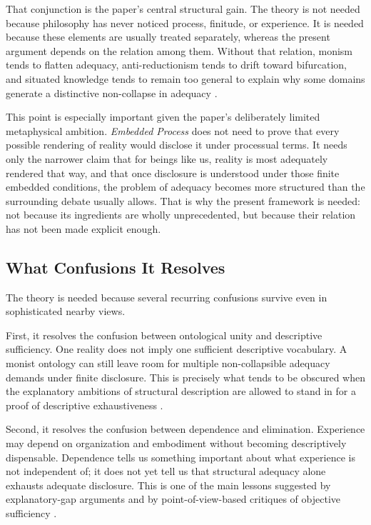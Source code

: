 \documentclass[11pt]{article}
\renewcommand{\emph}[1]{\textit{#1}}
\begin{document}
That conjunction is the paper's central structural gain. The theory is not needed because philosophy has never noticed process, finitude, or experience. It is needed because these elements are usually treated separately, whereas the present argument depends on the relation among them. Without that relation, monism tends to flatten adequacy, anti-reductionism tends to drift toward bifurcation, and situated knowledge tends to remain too general to explain why some domains generate a distinctive non-collapse in adequacy \cite{Whitehead1978,Rescher1996,Haraway1988,Polanyi1958,Nagel1986}.

This point is especially important given the paper's deliberately limited metaphysical ambition. \emph{Embedded Process} does not need to prove that every possible rendering of reality would disclose it under processual terms. It needs only the narrower claim that for beings like us, reality is most adequately rendered that way, and that once disclosure is understood under those finite embedded conditions, the problem of adequacy becomes more structured than the surrounding debate usually allows. That is why the present framework is needed: not because its ingredients are wholly unprecedented, but because their relation has not been made explicit enough.

\subsection{What Confusions It Resolves}

The theory is needed because several recurring confusions survive even in sophisticated nearby views.

First, it resolves the confusion between ontological unity and descriptive sufficiency. One reality does not imply one sufficient descriptive vocabulary. A monist ontology can still leave room for multiple non-collapsible adequacy demands under finite disclosure. This is precisely what tends to be obscured when the explanatory ambitions of structural description are allowed to stand in for a proof of descriptive exhaustiveness \cite{Levine1983,Chalmers1995}.

Second, it resolves the confusion between dependence and elimination. Experience may depend on organization and embodiment without becoming descriptively dispensable. Dependence tells us something important about what experience is not independent of; it does not yet tell us that structural adequacy alone exhausts adequate disclosure. This is one of the main lessons suggested by explanatory-gap arguments and by point-of-view-based critiques of objective sufficiency \cite{Nagel1974,Levine1983}.
\end{document}
